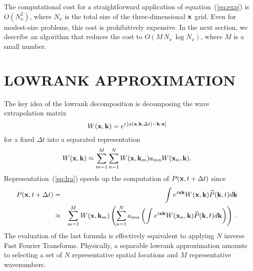 The computational cost for a straightforward application of
equation~(\ref{eq:exp}) is $O(N_x^2)$, where $N_x$ is the total size
of the three-dimensional $\mathbf{x}$ grid. Even for modest-size problems,
this cost is prohibitively expensive. In the next section, we describe
an algorithm that reduces the cost to $O(M\,N_x\,\log{N_x})$, where
$M$ is a small number.

\section{LOWRANK APPROXIMATION}

The key idea of the lowrank decomposition is decomposing the
wave extrapolation matrix
\begin{equation}
\label{eq:mat}
W(\mathbf{x},\mathbf{k}) = e^{i\,\left[\phi(\mathbf{x},\mathbf{k},\Delta t)-\mathbf{k} \cdot \mathbf{x}\right]}
\end{equation}
for a fixed $\Delta t$ into a separated representation
\begin{equation}
  \label{eq:lra}
  W(\mathbf{x},\mathbf{k}) \approx \sum\limits_{m=1}^M \sum\limits_{n=1}^N W(\mathbf{x},\mathbf{k}_m) a_{mn} W(\mathbf{x}_n,\mathbf{k}).
\end{equation}
Representation~(\ref{eq:lra}) speeds up the computation of
$P(\mathbf{x},t+\Delta t)$ since
\begin{eqnarray}
\nonumber
  P(\mathbf{x},t+\Delta t) & = & \int e^{i \mathbf{x} \mathbf{k}} W(\mathbf{x},\mathbf{k}) \widehat{P}(\mathbf{k},t) d
  \mathbf{k} \\
 & \approx & \sum\limits_{m=1}^M W(\mathbf{x},\mathbf{k}_m) \left( \sum\limits_{n=1}^N a_{mn} \left(\int e^{i \mathbf{x}\mathbf{k}} W(\mathbf{x}_n,\mathbf{k}) \widehat{P}(\mathbf{k},t) d\mathbf{k} \right) \right)\;.
\label{eq:pxt}
\end{eqnarray}
The evaluation of the last formula is effectively equivalent to
applying $N$ inverse Fast Fourier Transforms. Physically, a separable
lowrank approximation amounts to selecting a set of $N$ representative
spatial locations and $M$ representative wavenumbers.

